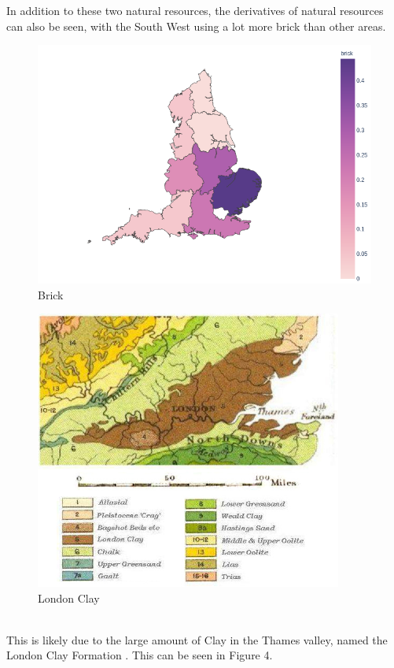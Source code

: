 \documentclass[11pt]{article}
\begin{document}
In addition to these two natural resources, the derivatives of natural resources can also be seen, with the South West using a lot more brick than other areas.

\begin{minipage}{0.45\textwidth}
	\begin{figure}[H]
		\centering
		\includegraphics[width=\textwidth]{brick.png}
		\caption{Brick}
	\end{figure}
\end{minipage}
\begin{minipage}{0.45\textwidth}
	\begin{figure}[H]
		\centering
		\includegraphics[width=0.9\textwidth]{Geological_map_of_London_Basin.jpg}
		\caption{London Clay}
	\end{figure}
\end{minipage}
\vspace{1cm}
\\
This is likely due to the large amount of Clay in the Thames valley, named the London Clay Formation \cite{sumbler1996london}. This can be seen in Figure 4.
\end{document}
